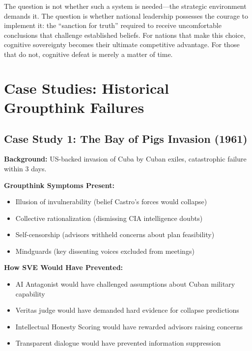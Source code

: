 \documentclass[11pt,a4paper]{article}
\begin{document}
\begin{small}
The question is not whether such a system is needed—the strategic environment demands it. The question is whether national leadership possesses the courage to implement it: the ``sanction for truth'' required to receive uncomfortable conclusions that challenge established beliefs. For nations that make this choice, cognitive sovereignty becomes their ultimate competitive advantage. For those that do not, cognitive defeat is merely a matter of time.




\clearpage
\appendix

\section{Case Studies: Historical Groupthink Failures}
\label{app:casestudies}

\subsection*{Case Study 1: The Bay of Pigs Invasion (1961)}

\textbf{Background:} US-backed invasion of Cuba by Cuban exiles, catastrophic failure within 3 days.

\textbf{Groupthink Symptoms Present:}
\begin{itemize}[nosep]
    \item Illusion of invulnerability (belief Castro's forces would collapse)
    \item Collective rationalization (dismissing CIA intelligence doubts)
    \item Self-censorship (advisors withheld concerns about plan feasibility)
    \item Mindguards (key dissenting voices excluded from meetings)
\end{itemize}

\textbf{How SVE Would Have Prevented:}
\begin{itemize}[nosep]
    \item AI Antagonist would have challenged assumptions about Cuban military capability
    \item Veritas judge would have demanded hard evidence for collapse predictions
    \item Intellectual Honesty Scoring would have rewarded advisors raising concerns
    \item Transparent dialogue would have prevented information suppression
\end{itemize}


\end{small}
\end{document}

